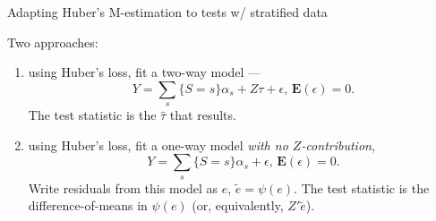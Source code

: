 \begin{frame}{Adapting Huber's M-estimation to tests w/ stratified data}


      Two approaches:
      \begin{enumerate}
      \item using Huber's loss, fit a two-way model  ---
$$
Y = \sum_{s}\{S=s\}\alpha_{s} + Z\tau + \epsilon,\, \mathbf{E}(\epsilon) = 0.
$$
The test statistic is the $\hat{\tau}$ that results.
\item using Huber's loss, fit a one-way model \textit{with no $Z$-contribution},
$$
Y = \sum_{s}\{S=s\}\alpha_{s} + \epsilon,\, \mathbf{E}(\epsilon) = 0.
$$
Write residuals from this model as $e$, $\tilde{e} = \psi(e)$.  The test statistic is the difference-of-means in $\psi(e)$ (or, equivalently, $Z'\tilde{e}$).
      \end{enumerate}



  
\end{frame}

